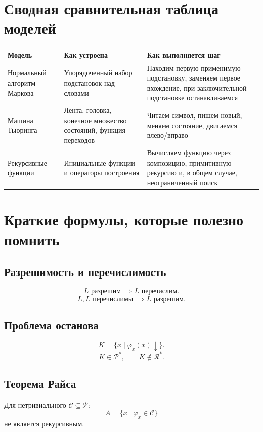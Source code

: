 \documentclass[12pt,a4paper]{article}
\begin{document}
\section{Сводная сравнительная таблица моделей}

\begin{center}
\begin{longtable}{|>{\raggedright\arraybackslash}p{3.7cm}|>{\raggedright\arraybackslash}p{5.4cm}|>{\raggedright\arraybackslash}p{5.4cm}|}
\hline
\textbf{Модель} & \textbf{Как устроена} & \textbf{Как выполняется шаг} \\
\hline
Нормальный алгоритм Маркова & Упорядоченный набор подстановок над словами & Находим первую применимую подстановку, заменяем первое вхождение, при заключительной подстановке останавливаемся \\
\hline
Машина Тьюринга & Лента, головка, конечное множество состояний, функция переходов & Читаем символ, пишем новый, меняем состояние, двигаемся влево/вправо \\
\hline
Рекурсивные функции & Инициальные функции и операторы построения & Вычисляем функцию через композицию, примитивную рекурсию и, в общем случае, неограниченный поиск \\
\hline
\end{longtable}
\end{center}

\section{Краткие формулы, которые полезно помнить}

\subsection*{Разрешимость и перечислимость}
\[
L \text{ разрешим } \Rightarrow L \text{ перечислим}.
\]
\[
L,\overline L \text{ перечислимы } \Rightarrow L \text{ разрешим}.
\]

\subsection*{Проблема останова}
\[
K=\{x\mid \varphi_x(x)\downarrow\}.
\]
\[
K \in \mathcal P^*, \qquad K \notin \mathcal R^*.
\]

\subsection*{Теорема Райса}
Для нетривиального $\mathcal C\subseteq\mathcal P$:
\[
A=\{x\mid \varphi_x\in \mathcal C\}
\]
не является рекурсивным.
\end{document}
